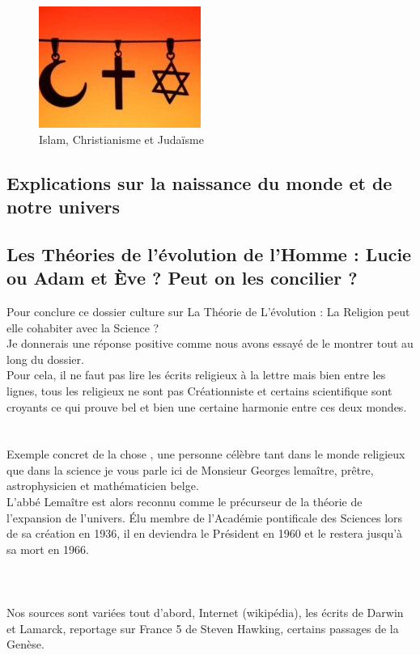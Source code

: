 \documentclass[twoside, openany]{report}
\begin{document}
	\begin{figure}[h]
	\begin{center}
		\includegraphics[width=200px]{img2.png}
	\end{center}
		\caption{Islam, Christianisme et Judaïsme}
	\end{figure}
	\tableofcontents
	\textcolor{vert}{\part{Explications sur la naissance 
							du monde et de notre univers}}
		
	\textcolor{vert}{\part{Les Théories de l'évolution de l'Homme : 
							Lucie ou Adam et Ève ? Peut on les concilier ?}}
		
		\newpage
		\vfill
		\vspace{6cm}
Pour conclure ce dossier culture sur La Théorie de L'évolution : La Religion peut 
elle cohabiter avec la Science ?\\
Je donnerais une réponse positive comme nous avons essayé de le montrer tout au 
long du dossier.\\ 
Pour cela, il ne faut pas lire les écrits religieux à la lettre mais bien entre
les lignes, tous les religieux ne sont pas Créationniste et certains scientifique
sont croyants ce qui prouve bel et bien une certaine harmonie entre ces deux 
mondes.\\ \\ \\

Exemple concret de la chose , une personne célèbre tant dans le monde religieux 
que dans la science je vous parle ici de Monsieur Georges lemaître, prêtre, 
astrophysicien et mathématicien belge.\\ 
L'abbé Lemaître est alors reconnu comme le précurseur de la théorie de 
l'expansion de l'univers. Élu membre de l'Académie pontificale des Sciences lors
de sa création en 1936, il en deviendra le Président en 1960 et le restera 
jusqu'à sa mort en 1966. \\ \\ \\ \\

Nos sources sont variées tout d'abord, Internet (wikipédia), les écrits de Darwin 
et Lamarck, reportage sur France 5 de Steven Hawking, certains passages de la Genèse.
		\vfill
\end{document}
